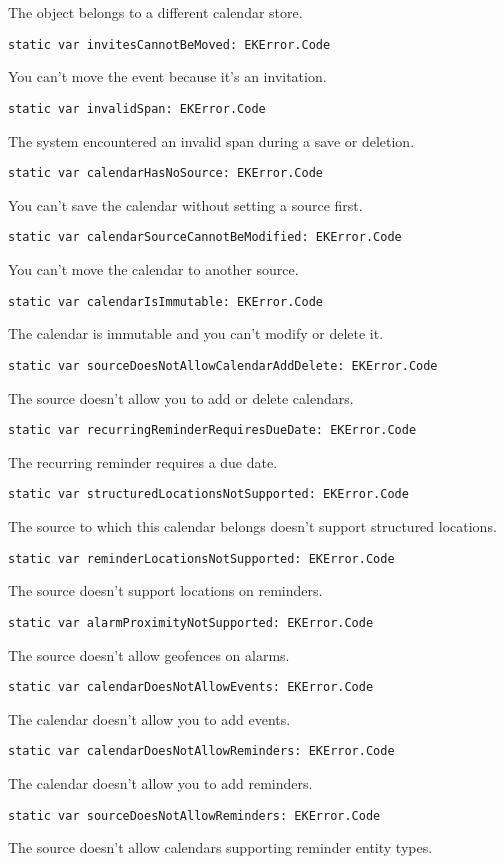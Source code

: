 \documentclass{article}
\begin{document}
The object belongs to a different calendar store.

\texttt{static var invitesCannotBeMoved: EKError.Code}

You can't move the event because it's an invitation.

\texttt{static var invalidSpan: EKError.Code}

The system encountered an invalid span during a save or deletion.

\texttt{static var calendarHasNoSource: EKError.Code}

You can't save the calendar without setting a source first.

\texttt{static var calendarSourceCannotBeModified: EKError.Code}

You can't move the calendar to another source.

\texttt{static var calendarIsImmutable: EKError.Code}

The calendar is immutable and you can't modify or delete it.

\texttt{static var sourceDoesNotAllowCalendarAddDelete: EKError.Code}

The source doesn't allow you to add or delete calendars.

\texttt{static var recurringReminderRequiresDueDate: EKError.Code}

The recurring reminder requires a due date.

\texttt{static var structuredLocationsNotSupported: EKError.Code}

The source to which this calendar belongs doesn't support structured locations.

\texttt{static var reminderLocationsNotSupported: EKError.Code}

The source doesn't support locations on reminders.

\texttt{static var alarmProximityNotSupported: EKError.Code}

The source doesn't allow geofences on alarms.

\texttt{static var calendarDoesNotAllowEvents: EKError.Code}

The calendar doesn't allow you to add events.

\texttt{static var calendarDoesNotAllowReminders: EKError.Code}

The calendar doesn't allow you to add reminders.

\texttt{static var sourceDoesNotAllowReminders: EKError.Code}

The source doesn't allow calendars supporting reminder entity types.
\end{document}
